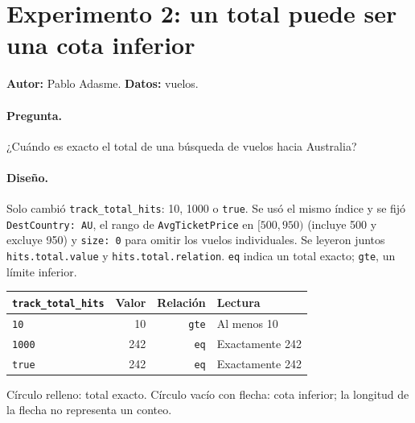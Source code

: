 \documentclass[11pt,a4paper]{article}
\newcommand{\codigo}[1]{\texttt{#1}}
\begin{document}
\clearpage
\section{Experimento 2: un total puede ser una cota inferior}
\textbf{Autor:} Pablo Adasme. \textbf{Datos:} vuelos.

\paragraph{Pregunta.}
¿Cuándo es exacto el total de una búsqueda de vuelos hacia Australia?

\paragraph{Diseño.}
Solo cambió \codigo{track\_total\_hits}: 10, 1000 o \codigo{true}. Se usó el
mismo índice y se fijó \codigo{DestCountry: AU}, el rango de
\codigo{AvgTicketPrice} en $[500,950)$ (incluye 500 y excluye 950) y
\codigo{size: 0} para omitir los vuelos individuales. Se leyeron juntos
\codigo{hits.total.value} y \codigo{hits.total.relation}.
\codigo{eq} indica un total exacto; \codigo{gte}, un límite inferior.

\begin{center}
\begin{tabular}{lrrl}
\toprule
\codigo{track\_total\_hits} & Valor & Relación & Lectura\\
\midrule
\codigo{10}   & 10  & \codigo{gte} & Al menos 10\\
\codigo{1000} & 242 & \codigo{eq}  & Exactamente 242\\
\codigo{true} & 242 & \codigo{eq}  & Exactamente 242\\
\bottomrule
\end{tabular}
\end{center}

\begin{center}
\par\small Círculo relleno: total exacto. Círculo vacío con flecha:
cota inferior; la longitud de la flecha no representa un conteo.
\end{center}
\end{document}
